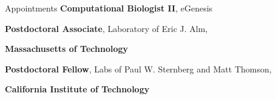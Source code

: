 \begin{rubric}{Appointments}
\entry*[11/2019 -]
	\textbf{Computational Biologist II}, eGenesis

\entry*[01/2019--11/2019]
		\textbf{Postdoctoral Associate}, Laboratory of Eric J. Alm,
		\par \textbf{Massachusetts of Technology}

\entry*[11/2018--01/2019]
		\textbf{Postdoctoral Fellow}, Labs of Paul W. Sternberg and Matt Thomson,
		\par \textbf{California Institute of Technology}

\end{rubric}

